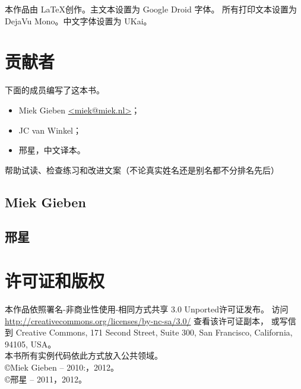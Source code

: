 \noindent{}本作品由 \LaTeX 创作。主文本设置为 Google Droid 字体。
所有打印文本设置为 DejaVu Mono。中文字体设置为 UKai。

\section{贡献者}
下面的成员编写了这本书。
\begin{itemize}
\item{Miek Gieben \qquad\url{<miek@miek.nl>}}；
\item{JC van Winkel}；
\item{邢星，中文译本}。
\end{itemize}

帮助试读、检查练习和改进文案（不论真实姓名还是别名都不分排名先后）


\subsection{Miek Gieben}


\subsection{邢星}


\section{许可证和版权}

本作品依照署名-非商业性使用-相同方式共享 3.0 Unported许可证发布。
访问 \url{http://creativecommons.org/licenses/by-nc-sa/3.0/} 查看该许可证副本，
或写信到 Creative Commons, 171 Second Street, Suite 300,
San Francisco, California, 94105, USA。\\
本书所有实例代码依此方式放入公共领域。\\
\copyright Miek Gieben -- 2010:，2012。\\
\copyright 邢星 -- 2011，2012。

